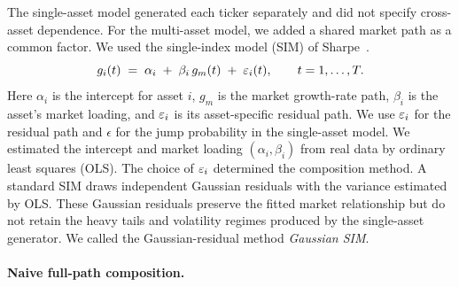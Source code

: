 
The single-asset model generated each ticker separately and did not
specify cross-asset dependence. For the multi-asset model, we added a
shared market path as a common factor. We used the single-index model
(SIM) of Sharpe~\cite{sharpe1963}.
\begin{equation}
  g_i(t) \;=\; \alpha_i \;+\; \beta_i\, g_m(t) \;+\; \varepsilon_i(t),
  \qquad t = 1,\dots,T.
  \label{eq:sim-composition}
\end{equation}
Here $\alpha_i$ is the intercept for asset $i$, $g_m$ is the market
growth-rate path, $\beta_i$ is the asset's market loading, and
$\varepsilon_i$ is its asset-specific residual path. We use $\varepsilon_i$ for the
residual path and $\epsilon$ for the jump probability in the
single-asset model. We estimated the intercept and market loading
$(\alpha_i,\beta_i)$ from real data by
ordinary least squares (OLS). The choice of $\varepsilon_i$ determined the
composition method. A standard SIM draws independent Gaussian residuals
with the variance estimated by OLS. These Gaussian residuals preserve
the fitted market relationship but do not retain the heavy tails and
volatility regimes produced by the single-asset generator. We called
the Gaussian-residual method \emph{Gaussian SIM}.

\paragraph{Naive full-path composition.}

